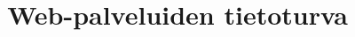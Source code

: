 \documentclass[finnish,logo,nonumbib,creativecommons,nocopyright,lof,pdftex,palatino,utf8]{gradu2}
\title{Web-palveluiden tietoturva}
\begin{document}



\mainmatter







{}
%



%
%
\end{document}

